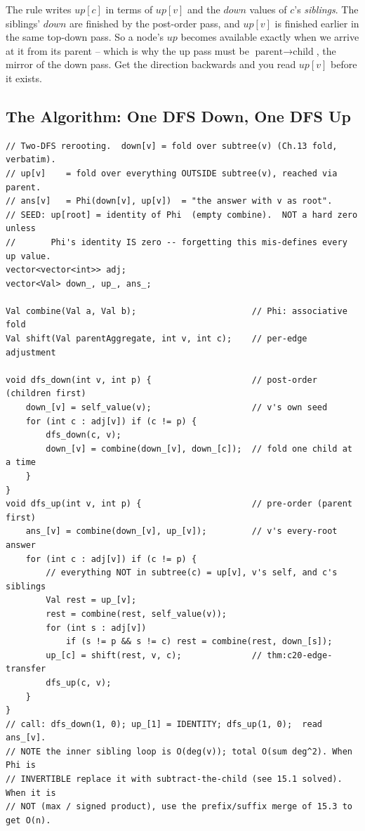 \begin{insightbox}
The rule writes $\mathit{up}[c]$ in terms of $\mathit{up}[v]$ and the
$\mathit{down}$ values of $c$'s \emph{siblings}. The siblings' $\mathit{down}$
are finished by the post-order pass, and $\mathit{up}[v]$ is finished earlier in
the same top-down pass. So a node's $\mathit{up}$ becomes available exactly when
we arrive at it from its parent -- which is why the up pass must be
$\text{parent}\to\text{child}$, the mirror of the down pass. Get the direction
backwards and you read $\mathit{up}[v]$ before it exists.
\end{insightbox}

\subsection{The Algorithm: One DFS Down, One DFS Up}

\begin{lstlisting}[caption={The generic two-DFS rerooting template. The down pass is Ch.13's fold verbatim; the up pass applies thm:c20-edge-transfer parent-before-child.}, label={lst:c20-twodfs}]
// Two-DFS rerooting.  down[v] = fold over subtree(v) (Ch.13 fold, verbatim).
// up[v]    = fold over everything OUTSIDE subtree(v), reached via parent.
// ans[v]   = Phi(down[v], up[v])  = "the answer with v as root".
// SEED: up[root] = identity of Phi  (empty combine).  NOT a hard zero unless
//       Phi's identity IS zero -- forgetting this mis-defines every up value.
vector<vector<int>> adj;
vector<Val> down_, up_, ans_;

Val combine(Val a, Val b);                       // Phi: associative fold
Val shift(Val parentAggregate, int v, int c);    // per-edge adjustment

void dfs_down(int v, int p) {                    // post-order (children first)
    down_[v] = self_value(v);                    // v's own seed
    for (int c : adj[v]) if (c != p) {
        dfs_down(c, v);
        down_[v] = combine(down_[v], down_[c]);  // fold one child at a time
    }
}
void dfs_up(int v, int p) {                      // pre-order (parent first)
    ans_[v] = combine(down_[v], up_[v]);         // v's every-root answer
    for (int c : adj[v]) if (c != p) {
        // everything NOT in subtree(c) = up[v], v's self, and c's siblings
        Val rest = up_[v];
        rest = combine(rest, self_value(v));
        for (int s : adj[v])
            if (s != p && s != c) rest = combine(rest, down_[s]);
        up_[c] = shift(rest, v, c);              // thm:c20-edge-transfer
        dfs_up(c, v);
    }
}
// call: dfs_down(1, 0); up_[1] = IDENTITY; dfs_up(1, 0);  read ans_[v].
// NOTE the inner sibling loop is O(deg(v)); total O(sum deg^2). When Phi is
// INVERTIBLE replace it with subtract-the-child (see 15.1 solved). When it is
// NOT (max / signed product), use the prefix/suffix merge of 15.3 to get O(n).
\end{lstlisting}

